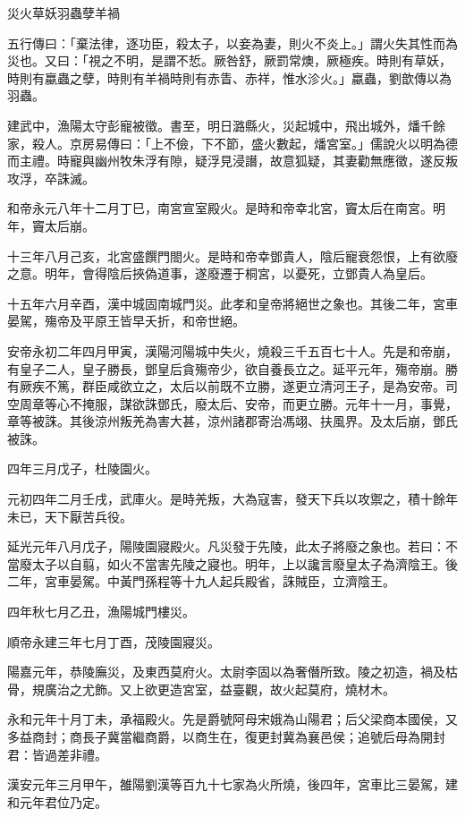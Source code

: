
\begin{pinyinscope}
災火草妖羽蟲孽羊禍

五行傳曰：「棄法律，逐功臣，殺太子，以妾為妻，則火不炎上。」謂火失其性而為災也。又曰：「視之不明，是謂不悊。厥咎舒，厥罰常燠，厥極疾。時則有草妖，時則有蠃蟲之孽，時則有羊禍時則有赤眚、赤祥，惟水沴火。」蠃蟲，劉歆傳以為羽蟲。

建武中，漁陽太守彭寵被徵。書至，明日潞縣火，災起城中，飛出城外，燔千餘家，殺人。京房易傳曰：「上不儉，下不節，盛火數起，燔宮室。」儒說火以明為德而主禮。時寵與幽州牧朱浮有隙，疑浮見浸譖，故意狐疑，其妻勸無應徵，遂反叛攻浮，卒誅滅。

和帝永元八年十二月丁巳，南宮宣室殿火。是時和帝幸北宮，竇太后在南宮。明年，竇太后崩。

十三年八月己亥，北宮盛饌門閤火。是時和帝幸鄧貴人，陰后寵衰怨恨，上有欲廢之意。明年，會得陰后挾偽道事，遂廢遷于桐宮，以憂死，立鄧貴人為皇后。

十五年六月辛酉，漢中城固南城門災。此孝和皇帝將絕世之象也。其後二年，宮車晏駕，殤帝及平原王皆早夭折，和帝世絕。

安帝永初二年四月甲寅，漢陽河陽城中失火，燒殺三千五百七十人。先是和帝崩，有皇子二人，皇子勝長，鄧皇后貪殤帝少，欲自養長立之。延平元年，殤帝崩。勝有厥疾不篤，群臣咸欲立之，太后以前既不立勝，遂更立清河王子，是為安帝。司空周章等心不掩服，謀欲誅鄧氏，廢太后、安帝，而更立勝。元年十一月，事覺，章等被誅。其後涼州叛羌為害大甚，涼州諸郡寄治馮翊、扶風界。及太后崩，鄧氏被誅。

四年三月戊子，杜陵園火。

元初四年二月壬戌，武庫火。是時羌叛，大為寇害，發天下兵以攻禦之，積十餘年未已，天下厭苦兵役。

延光元年八月戊子，陽陵園寢殿火。凡災發于先陵，此太子將廢之象也。若曰：不當廢太子以自翦，如火不當害先陵之寢也。明年，上以讒言廢皇太子為濟陰王。後二年，宮車晏駕。中黃門孫程等十九人起兵殿省，誅賊臣，立濟陰王。

四年秋七月乙丑，漁陽城門樓災。

順帝永建三年七月丁酉，茂陵園寢災。

陽嘉元年，恭陵廡災，及東西莫府火。太尉李固以為奢僭所致。陵之初造，禍及枯骨，規廣治之尤飾。又上欲更造宮室，益臺觀，故火起莫府，燒材木。

永和元年十月丁未，承福殿火。先是爵號阿母宋娥為山陽君；后父梁商本國侯，又多益商封；商長子冀當繼商爵，以商生在，復更封冀為襄邑侯；追號后母為開封君：皆過差非禮。

漢安元年三月甲午，雒陽劉漢等百九十七家為火所燒，後四年，宮車比三晏駕，建和元年君位乃定。


\end{pinyinscope}
